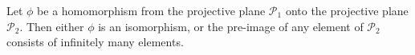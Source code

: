 Let $\phi$ be a homomorphism from the projective plane $\mathcal{P}_1$ onto the projective plane $\mathcal{P}_2$. Then either $\phi$ is an isomorphism, or the pre-image of any element of $\mathcal{P}_2$ consists of infinitely many elements.
